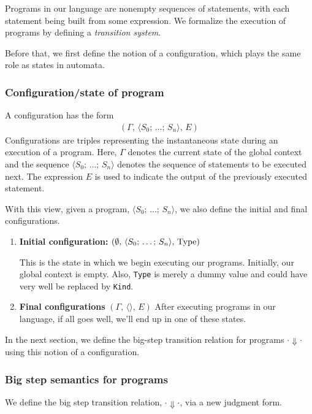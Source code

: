 \documentclass{article}
\begin{document}
Programs in our language are nonempty sequences of statements, with each
statement being built from some expression.
We formalize the execution of programs by defining a
\textit{transition system}.

Before that, we first define the notion of a configuration, which plays the
same role as states in automata. 

\subsubsection{Configuration/state of program}
A configuration has the form
\begin{align*}
  (\Gamma, \, \langle S_0; \, \dots; \, S_n \rangle, \, E)
\end{align*}
Configurations are triples representing the instantaneous state during an
execution of a program. Here, $\Gamma$ denotes the current state of the
global context and the sequence $\langle S_0; \, \dots; \, S_n \rangle$ denotes
the sequence of statements to be executed next. 
The expression $E$ is used to indicate the output of the previously executed
statement.

With this view, given a program, $\langle S_0; \, \dots; \, S_n
\rangle$, we also define the initial and final configurations.
\begin{enumerate}
\item \textbf{Initial configuration:}
  $ (\emptyset, \, \langle S_0; \, \dots; \, S_n \rangle, \, \operatorname{Type})$

  This is the state in which we begin executing our programs.
  Initially, our global context is empty. Also, \verb|Type| is merely a dummy
  value and could have very well be replaced by \verb|Kind|.

\item \textbf{Final configurations} $(\Gamma, \, \langle \rangle, \, E)$
After executing programs in our language, if all goes well, we'll end up in
one of these states.
\end{enumerate}

In the next section, we define the big-step transition relation for programs $\cdot
\Downarrow \cdot$ using
this notion of a configuration.

\subsubsection{Big step semantics for programs}
We define the big step transition relation, $\cdot \Downarrow \cdot$, via a
new judgment form.
\end{document}

